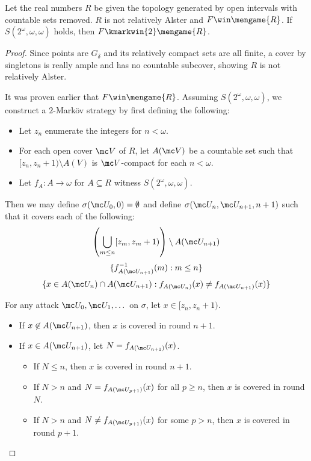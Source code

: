   \begin{ex}
    Let the real numbers $R$ be given the topology generated by open intervals with countable sets removed. $R$ is not relatively Alster and $F\win\mengame{R}$. If $S(2^\omega,\omega,\omega)$ holds, then $F\kmarkwin{2}\mengame{R}$.
  \end{ex}

  \begin{proof}
    Since points are $G_\delta$ and its relatively compact sets are all finite, a cover by singletons is really ample and has no countable subcover, showing $R$ is not relatively Alster.

    It was proven earlier that $F\win\mengame{R}$. Assuming $S(2^\omega,\omega,\omega)$, we construct a $2$-Mark\"ov strategy by first defining the following:
      \begin{itemize}
        \item Let $z_n$ enumerate the integers for $n<\omega$.
        \item For each open cover $\mc V$ of $R$, let $A(\mc V)$ be a countable set such that $[z_n,z_n+1)\setminus A(V)$ is $\mc V$-compact for each $n<\omega$.
        \item Let $f_A:A\to\omega$ for $A\subseteq R$ witness $S(2^\omega,\omega,\omega)$.
      \end{itemize}

    Then we may define $\sigma(\mc U_0,0)=\emptyset$ and define $\sigma(\mc U_n,\mc U_{n+1},n+1)$ such that it covers each of the following:
      \[
        \left(\bigcup_{m\leq n} [z_m,z_m+1)\right) \setminus A(\mc U_{n+1})
      \]
      \[
        \{f_{A(\mc U_{n+1})}^{-1}(m) : m\leq n\}
      \]
      \[
        \{x \in A(\mc U_n)\cap A(\mc U_{n+1}) : f_{A(\mc U_{n})}(x)\not= f_{A(\mc U_{n+1})}(x)\}
      \]

    For any attack $\mc U_0,\mc U_1,\dots$ on $\sigma$, let $x\in[z_n,z_n+1)$. 
      \begin{itemize}
        \item If $x\not\in A(\mc U_{n+1})$, then $x$ is covered in round $n+1$.
        \item If $x\in A(\mc U_{n+1})$, let $N=f_{A(\mc U_{n+1})}(x)$. 
        \begin{itemize}
          \item If $N\leq n$, then $x$ is covered in round $n+1$.
          \item If $N>n$ and $N=f_{A(\mc U_{p+1})}(x)$ for all $p\geq n$, then $x$ is covered in round $N$.
          \item If $N>n$ and $N\not=f_{A(\mc U_{p+1})}(x)$ for some $p>n$, then $x$ is covered in round $p+1$.
        \end{itemize}
      \end{itemize}
  \end{proof}

